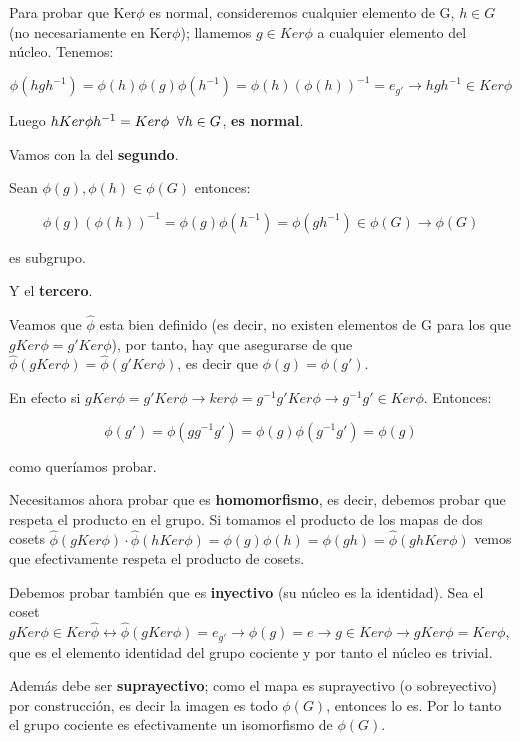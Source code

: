 \documentclass{article}
\begin{document}
 Para probar que Ker$\phi$ es normal, consideremos cualquier elemento de G, $h\in G$ (no necesariamente en Ker$\phi$); llamemos $g\in Ker \phi$ a cualquier elemento del núcleo. Tenemos:

 $$\phi (hgh^{-1})=\phi(h)\phi (g)\phi (h^{-1})=\phi(h)(\phi(h))^{-1}=e_{g'}\rightarrow hgh^{-1}\in Ker\phi$$


Luego $hKer\phi h^{-1}=Ker \phi \hspace{0.2cm} \forall h\in G$, \textbf{es normal}.

 \bigskip
 Vamos con la del \textbf{segundo}.
 \smallskip

 Sean $\phi (g),\phi (h)\in  \phi(G)$ entonces:

 $$\phi (g)(\phi(h))^{-1}=\phi (g)\phi (h^{-1})=\phi (gh^{-1})\in \phi (G)\rightarrow \phi (G)$$

es subgrupo.

  \bigskip
  Y el \textbf{tercero}.

  Veamos que $\hat{\phi}$ esta bien definido (es decir, no existen elementos de G para los que $gKer\phi =g'Ker\phi$), por tanto, hay que asegurarse de que $\hat{\phi} (gKer\phi)=\hat{\phi}(g'Ker\phi)$, es decir que $\phi(g)=\phi (g')$.
  \smallskip

  En efecto si $gKer\phi =g'Ker \phi \rightarrow ker\phi=g^{-1}g'Ker\phi \rightarrow g^{-1} g' \in Ker \phi$. Entonces:

 $$ \phi (g')= \phi (gg^{-1}g')=\phi (g)\phi (g^{-1}g')=\phi (g)$$

 como queríamos probar.

 \smallskip
 Necesitamos ahora probar que es \textbf{homomorfismo}, es decir, debemos probar que respeta el producto en el grupo. Si tomamos el producto de los mapas de dos cosets $\hat{\phi} (gKer\phi)\cdot \hat{\phi} (hKer\phi)=\phi (g)\phi (h)=\phi (gh)=\hat{\phi} (ghKer\phi)$ vemos que efectivamente respeta el producto de cosets.

 \smallskip
 Debemos probar también que es \textbf{inyectivo} (su núcleo es la identidad). Sea el coset $gKer\phi \in Ker\hat{\phi} \leftrightarrow \hat{\phi} (gKer\phi)=e_{g'}\rightarrow \phi (g)=e \rightarrow g\in Ker \phi \rightarrow gKer\phi =Ker\phi$, que es el elemento identidad del grupo cociente y por tanto el núcleo es trivial.

 \smallskip
 Además debe ser \textbf{suprayectivo}; como el mapa es suprayectivo (o sobreyectivo) por construcción, es decir la imagen es todo $\phi (G)$, entonces lo es. Por lo tanto el grupo cociente es efectivamente un isomorfismo de $\phi (G)$.
\end{document}
